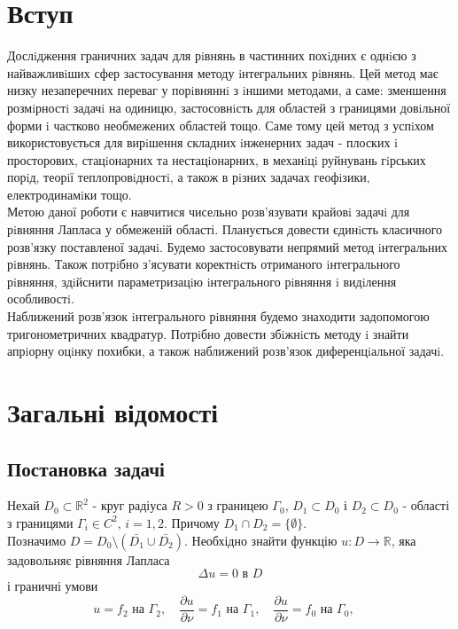 \documentclass[a4 paper,12pt,ukrainian]{report}
\begin{document}
\chapter*{\bf{Вступ}}
\hspace*{\parindent}Дослiдження граничних задач для рiвнянь в частинних похiдних є однiєю з
найважливiших сфер застосування методу iнтегральних рiвнянь. Цей метод має низку
незаперечних переваг у порiвняннi з iншими методами, а саме: зменшення розмiрностi
задачi на одиницю, застосовнiсть для областей з границями довiльної форми i частково
необмежених областей тощо. Саме тому цей метод з успiхом використовується для
вирiшення складних iнженерних задач - плоских i просторових, стацiонарних та
нестацiонарних, в механiцi руйнувань гiрських порiд, теорiї теплопровiдностi, а також
в рiзних задачах геофiзики, електродинамiки тощо.\\
\hspace*{\parindent}Метою даної роботи є навчитися чисельно розв’язувати крайовi задачi для
рiвняння Лапласа у обмеженій області. Планується довести єдинiсть класичного
розв’язку поставленої задачi. Будемо застосовувати непрямий метод iнтегральних рiвнянь. Також потрiбно
з’ясувати коректнiсть отриманого iнтегрального рiвняння, здiйснити
параметризацiю iнтегрального рiвняння i видiлення особливостi.\\
\hspace*{\parindent}Наближений розв’язок iнтегрального рiвняння будемо знаходити задопомогою тригонометричних квадратур. Потрiбно довести збiжнiсть методу i
знайти апрiорну оцiнку похибки, а також наближений розв’язок диференцiальної задачi.
\chapter{Загальні відомості}
\section{Постановка задачі}
\hspace*{\parindent}Нехай $D_0\subset \mathbb{R}^2$ - круг радіуса $R>0$ з границею $\Gamma_0$, $D_1\subset D_0$ і $D_2\subset D_0$ - області з границями $\Gamma_i\in C^2$, $i=1,2$. Причому $D_1\cap D_2=\{\emptyset\}$.\\ 
\hspace*{\parindent}Позначимо $D=D_0\setminus (\bar{D_1}\cup\bar{D_2})$. Необхідно знайти функцію $u:D \rightarrow \mathbb{R}$, яка задовольняє рівняння Лапласа
\begin{equation}
\Delta u=0\text{ в }D
\end{equation}
і граничні умови 
\begin{equation}
		u = f_2 \mbox{  на  }  \Gamma_2 ,\quad
		\frac{\partial u}{\partial \nu} = f_1 \mbox{  на  }  \Gamma_1 ,\quad
		\frac{\partial u}{\partial \nu} = f_0 \mbox{  на  } \Gamma_0 ,\quad
\end{equation}
\end{document}
